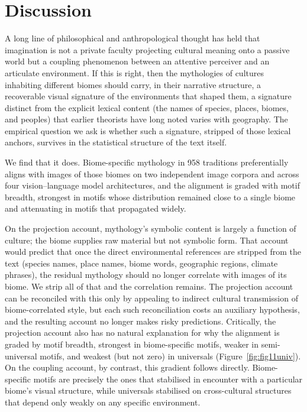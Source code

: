 \documentclass[11pt,a4paper]{article}
\begin{document}
\section*{Discussion}

A long line of philosophical and anthropological thought has held
that imagination is not a private faculty projecting cultural
meaning onto a passive world but a coupling phenomenon between an
attentive perceiver and an articulate environment. If this is right,
then the mythologies of cultures inhabiting different biomes should
carry, in their narrative structure, a recoverable visual signature
of the environments that shaped them, a signature distinct from the
explicit lexical content (the names of species, places, biomes, and
peoples) that earlier theorists have long noted varies with
geography. The empirical question we ask is whether such a
signature, stripped of those lexical anchors, survives in the
statistical structure of the text itself.

We find that it does. Biome-specific mythology in 958 traditions
preferentially aligns with images of those biomes on two independent
image corpora and across four vision--language model architectures,
and the alignment is graded with motif breadth, strongest in motifs
whose distribution remained close to a single biome and attenuating
in motifs that propagated widely.

On the projection account, mythology's symbolic content is largely a
function of culture; the biome supplies raw material but not symbolic
form. That account would predict that once the direct environmental
references are stripped from the text (species names, place names, biome words, geographic regions, climate phrases), the residual
mythology should no longer correlate with images of its biome. We
strip all of that and the correlation remains. The projection account
can be reconciled with this only by appealing to indirect cultural
transmission of biome-correlated style, but each such reconciliation
costs an auxiliary hypothesis, and the resulting account no longer
makes risky predictions. Critically, the projection account also has
no natural explanation for why the alignment is graded by motif
breadth, strongest in biome-specific motifs, weaker in
semi-universal motifs, and weakest (but not zero) in universals
(Figure~\ref{fig:fig11univ}). On the coupling account, by contrast,
this gradient follows directly. Biome-specific motifs are precisely
the ones that stabilised in encounter with a particular biome's
visual structure, while universals stabilised on cross-cultural
structures that depend only weakly on any specific environment.
\end{document}
